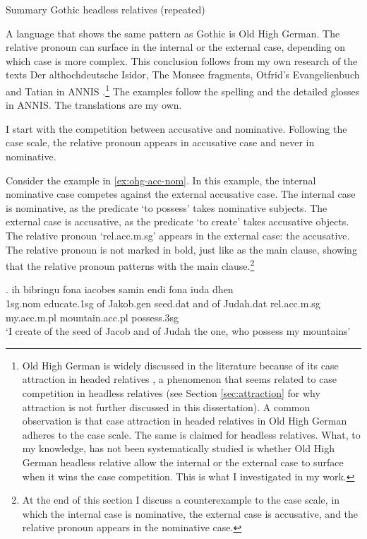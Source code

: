 \begin{table}[H]
  \center
  \caption{Summary Gothic headless relatives (repeated)}
    
    \label{tbl:summary-gothic-repeated}
\end{table}

A language that shows the same pattern as Gothic is Old High German. The relative pronoun can surface in the internal or the external case, depending on which case is more complex. This conclusion follows from my own research of the texts Der althochdeutsche Isidor, The Monsee fragments, Otfrid's Evangelienbuch and Tatian in ANNIS \citep{krause2016}.\footnote{
Old High German is widely discussed in the literature because of its case attraction in headed relatives \citep[cf.][]{pittner1995}, a phenomenon that seems related to case competition in headless relatives (see Section \ref{sec:attraction} for why attraction is not further discussed in this dissertation).
A common observation is that case attraction in headed relatives in Old High German adheres to the case scale. The same is claimed for headless relatives.
What, to my knowledge, has not been systematically studied is whether Old High German headless relative allow the internal or the external case to surface when it wins the case competition. This is what I investigated in my work.
}
The examples follow the spelling and the detailed glosses in ANNIS. The translations are my own.

I start with the competition between accusative and nominative. Following the case scale, the relative pronoun appears in accusative case and never in nominative.

Consider the example in \ref{ex:ohg-acc-nom}. In this example, the internal nominative case competes against the external accusative case.
The internal case is nominative, as the predicate  `to possess' takes nominative subjects.
The external case is accusative, as the predicate  `to create' takes accusative objects.
The relative pronoun  `\ac{rel}.\ac{acc}.\ac{m}.\ac{sg}' appears in the external case: the accusative. The relative pronoun is not marked in bold, just like as the main clause, showing that the relative pronoun patterns with the main clause.\footnote{
At the end of this section I discuss a counterexample to the case scale, in which the internal case is nominative, the external case is accusative, and the relative pronoun appears in the nominative case.
}


\exg. ih bibringu fona iacobes samin endi fona iuda dhen   \\
1\ac{sg}.\ac{nom} {educate}.1\ac{sg}\scsub{[acc]} of Jakob.\ac{gen} seed.\ac{dat} and of Judah.\ac{dat} \ac{rel}.\ac{acc}.\ac{m}.\ac{sg} my.\ac{acc}.\ac{m}.\ac{pl} mountain.\ac{acc}.\ac{pl} possess.3\ac{sg}\scsub{[nom]}\\
`I create of the seed of Jacob and of Judah the one, who possess my mountains' \label{ex:ohg-acc-nom}

